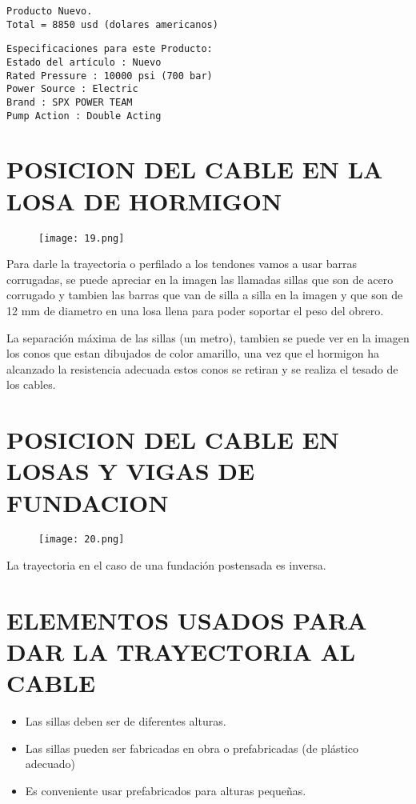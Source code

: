 \begin{verbatim}
Producto Nuevo.
Total = 8850 usd (dolares americanos)
\end{verbatim}

\begin{verbatim}
Especificaciones para este Producto:
Estado del artículo : Nuevo
Rated Pressure : 10000 psi (700 bar)
Power Source : Electric
Brand : SPX POWER TEAM
Pump Action : Double Acting
\end{verbatim}

\section{POSICION DEL CABLE EN LA LOSA DE HORMIGON}

\begin{figure}[H]
\centering
\texttt{[image: 19.png]}
\end{figure}

Para darle la trayectoria o perfilado a los tendones vamos
a usar barras corrugadas, se puede apreciar en la imagen las
llamadas sillas que son de acero corrugado y tambien las barras
que van de silla a silla en la imagen y que son de 12 mm de
diametro en una losa llena para poder soportar el peso
del obrero.

La separación máxima de las sillas (un metro), tambien se
puede ver en la imagen los conos que estan dibujados de color
amarillo, una vez que el hormigon ha alcanzado la resistencia
adecuada estos conos se retiran y se realiza el tesado de los
cables.

\section{POSICION DEL CABLE EN LOSAS Y VIGAS DE FUNDACION}

\begin{figure}[H]
\centering
\texttt{[image: 20.png]}
\end{figure}

La trayectoria en el caso de una fundación postensada es inversa.

\section{ELEMENTOS USADOS PARA DAR LA TRAYECTORIA AL CABLE}

\begin{itemize}
	\item Las sillas deben ser de diferentes alturas.
	\item {Las sillas pueden ser fabricadas en obra o prefabricadas
		(de plástico adecuado)}
	\item Es conveniente usar prefabricados para alturas pequeñas.
\end{itemize}

